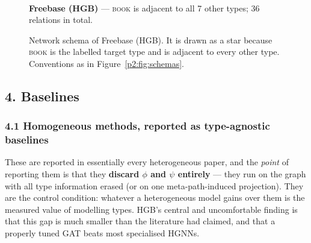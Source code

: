 \begin{figure}[htbp]
\centering
\begin{minipage}{0.7\textwidth}\centering
{}
\\[2pt]{\small\textbf{Freebase (HGB)} --- \textsc{book} is adjacent to all 7 other types; 36 relations in total.}
\end{minipage}
\caption{Network schema of Freebase (HGB). It is drawn as a star because \textsc{book} is the
labelled target type and is adjacent to every other type. Conventions as in
Figure~\ref{p2:fig:schemas}.}
\label{p2:fig:schemasc}
\end{figure}


\subsection*{4. Baselines}

\subsubsection*{4.1 Homogeneous methods, reported as type-agnostic baselines}

These are reported in essentially every heterogeneous paper, and the \emph{point} of reporting
them is that they \textbf{discard $\phi$ and $\psi$ entirely} --- they run on the graph with all
type information erased (or on one meta-path-induced projection). They are the control condition:
whatever a heterogeneous model gains over them is the measured value of modelling types. HGB's
central and uncomfortable finding is that this gap is much smaller than the literature had
claimed, and that a properly tuned GAT beats most specialised HGNNs.


